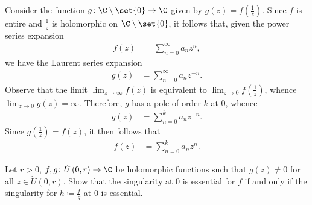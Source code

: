 \documentclass[10pt]{mypackage}
\begin{document}
\begin{solution}
  Consider the function $g\colon \C\setminus \set{0} \rightarrow \C$ given by $g(z) = f\left( \frac{1}{z} \right)$. Since $f$ is entire and $\frac{1}{z}$ is holomorphic on $\C\setminus \set{0}$, it follows that, given the power series expansion
  \begin{align*}
    f(z) &= \sum_{n=0}^{\infty}a_nz^{n},
  \end{align*}
  we have the Laurent series expansion
  \begin{align*}
    g(z) &= \sum_{n=0}^{\infty}a_nz^{-n}.
  \end{align*}
  Observe that the limit $\lim_{z\rightarrow\infty} f(z)$ is equivalent to $\lim_{z\rightarrow 0}f\left( \frac{1}{z} \right)$, whence $\lim_{z\rightarrow 0} g(z) = \infty$. Therefore, $g$ has a pole of order $k$ at $0$, whence
  \begin{align*}
    g(z) &= \sum_{n=0}^{k}a_nz^{-n}.
  \end{align*}
  Since $g\left( \frac{1}{z} \right) = f(z)$, it then follows that
  \begin{align*}
    f(z) &= \sum_{n=0}^{k} a_nz^{n}.
  \end{align*}
\end{solution}
\begin{problem}[Problem 5]
  Let $r > 0$, $f,g\colon \dot{U}\left( 0,r \right)\rightarrow \C$ be holomorphic functions such that $g(z)\neq 0$ for all $z\in \dot{U}\left( 0,r \right)$. Show that the singularity at $0$ is essential for $f$ if and only if the singularity for $h \coloneq \frac{f}{g}$ at $0$ is essential.
\end{problem}
\end{document}
